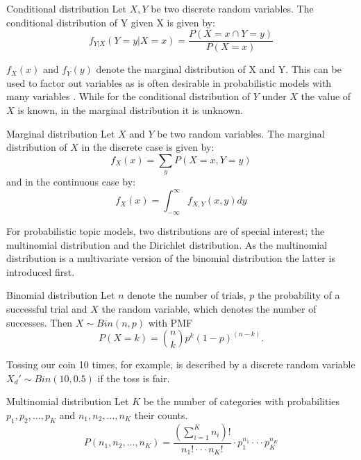 \begin{definition}{Conditional distribution} Let $X, Y$ be two discrete random variables. The conditional distribution of Y given X is given by:
\begin{equation}
f_{Y|X}(Y=y|X=x) = \frac{P(X=x \cap Y=y)}{P(X=x)}
\end{equation}
\end{definition}
$f_X(x)$ and $f_Y(y)$ denote the marginal distribution of X and Y. This can be used to factor out variables as is often desirable in probabilistic models with many variables \cite{DBLP:phd/dnb/Kling16}. While for the conditional distribution of $Y$ under $X$ the value of $X$ is known, in the marginal distribution it is unknown.
\begin{definition}{Marginal distribution}
Let $X$ and $Y$ be two random variables. The marginal distribution of $X$ in the discrete case is given by:
\begin{equation}
f_X(x) = \sum_y P(X=x,Y=y)
\end{equation}
and in the continuous case by:
\begin{equation}
f_X(x) = \int_{-\infty}^{\infty} f_{X,Y}(x,y)dy
\end{equation}
\end{definition}
For probabilistic topic models, two distributions are of special interest; the multinomial distribution and the Dirichlet distribution. As the multinomial distribution is a multivariate version of the binomial distribution the latter is introduced first.
\begin{definition}{Binomial distribution} Let $n$ denote the number of trials, $p$ the probability of a successful trial and $X$ the random variable, which denotes the number of successes. Then $X \sim Bin(n,p)$ with PMF
\begin{equation}
P(X=k) = {n \choose k} p^k (1-p)^{(n-k)} \text{.}
\end{equation}
\end{definition}
Tossing our coin 10 times, for example, is described by a discrete random variable $X_d\prime \sim Bin(10,0.5)$ if the toss is fair.
\begin{definition}{Multinomial distribution}
Let $K$ be the number of categories with probabilities $p_1, p_2, ..., p_K$ and $n_1, n_2, ...,n_K$ their counts.
\begin{equation}
P(n_1,n_2,...,n_K) = \frac{(\sum_{i=1}^K n_i)!}{n_1! \cdot \cdot \cdot n_K!} \cdot p_1^{n_1}\cdot \cdot \cdot p_K^{n_K}
\end{equation}
\end{definition}
